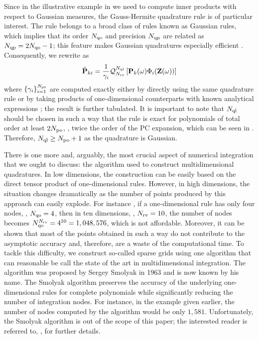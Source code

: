 Since in the illustrative example in  we need to compute inner products with respect to Gaussian measures, the Gauss-Hermite quadrature rule is of particular interest. The rule belongs to a broad class of rules known as Gaussian rules, which implies that its order $N_\text{qo}$ and precision $N_\text{qp}$ are related as $N_\text{qp} = 2 N_\text{qo} - 1$; this feature makes Gaussian quadratures especially efficient \cite{heiss2008}. Consequently, we rewrite  as
\[
  \hat{\mathbf{P}}_{ki} = \frac{1}{\gamma_i} \mathcal{Q}_{{N_\text{rv}}}^{N_\text{ql}}\left[\mathbf{P}_k(\omega) \Phi_i(\mathbf{Z}(\omega))\right]
\]
where $\{ \gamma_i \}_{i = 1}^{{N_\text{pt}}}$ are computed exactly either by directly using the same quadrature rule or by taking products of one-dimensional counterparts with known analytical expressions \cite{xiu2010}; the result is further tabulated. It is important to note that $N_\text{ql}$ should be chosen in such a way that the rule is exact for polynomials of total order at least $2 {N_\text{po}}$, \ie, twice the order of the PC expansion, which can be seen in  \cite{eldred2009}. Therefore, $N_\text{ql} \geq {N_\text{po}} + 1$ as the quadrature is Gaussian.

There is one more and, arguably, the most crucial aspect of numerical integration that we ought to discuss: the algorithm used to construct multidimensional quadratures. In low dimensions, the construction can be easily based on the direct tensor product of one-dimensional rules. However, in high dimensions, the situation changes dramatically as the number of points produced by this approach can easily explode. For instance \cite{heiss2008}, if a one-dimensional rule has only four nodes, \ie, $N_\text{qo} = 4$, then in ten dimensions, \ie, ${N_\text{rv}} = 10$, the number of nodes becomes $N_\text{qo}^{{N_\text{rv}}} = 4^{10} = 1,048,576$, which is not affordable. Moreover, it can be shown that most of the points obtained in such a way do not contribute to the asymptotic accuracy and, therefore, are a waste of the computational time. To tackle this difficulty, we construct so-called sparse grids using one algorithm that can reasonable be call the state of the art in multidimensional integration. The algorithm was proposed by Sergey Smolyak in 1963 and is now known by his name. The Smolyak algorithm preserves the accuracy of the underlying one-dimensional rules for complete polynomials while significantly reducing the number of integration nodes. For instance, in the example given earlier, the number of nodes computed by the algorithm would be only $1,581$. Unfortunately, the Smolyak algorithm is out of the scope of this paper; the interested reader is referred to, \eg, \cite{eldred2009, maitre2010, heiss2008} for further details.
